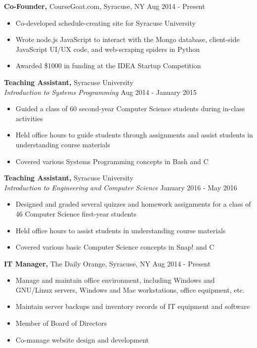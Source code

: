 \documentclass[margin]{res}
\begin{document}
\begin{resume}
 {\bf Co-Founder,} CourseGoat.com, Syracuse, NY \hfill
Aug 2014 - Present
\begin{itemize} \itemsep -2pt
\item  Co-developed schedule-creating site for Syracuse University
\item Wrote node.js JavaScript to interact with the Mongo database, client-side JavaScript UI/UX code, and web-scraping spiders in Python
\item Awarded \$1000 in funding at the IDEA Startup Competition
\end{itemize}

{\bf Teaching Assistant,} Syracuse University \\
{\it Introduction to Systems Programming}
 \hfill  Aug 2014 - January 2015
\begin{itemize} \itemsep -2pt %
\item Guided a class of 60 second-year Computer Science students during in-class activities
\item Held office hours to guide students through assignments and assist students in understanding course materials
\item Covered various Systems Programming concepts in Bash and C
\end{itemize}

{\bf Teaching Assistant,} Syracuse University \\
{\it Introduction to Engineering and Computer Science}
 \hfill  January 2016 - May 2016
\begin{itemize} \itemsep -2pt %
\item Designed and graded several quizzes and homework assignments for a class of 46 Computer Science first-year students
\item Held office hours to assist students in understanding course materials
\item Covered various basic Computer Science concepts in Snap! and C
\end{itemize}

 
{\bf IT Manager,} The Daily Orange, Syracuse, NY \hfill  Aug 2014 - Present
\begin{itemize} \itemsep -2pt %
\item Manage and maintain office environment, including Windows and GNU/Linux servers, Windows and Mac workstations, office equipment, etc.
\item Maintain server backups and inventory records of IT equipment and software
\item Member of Board of Directors
\item Co-manage website design and development
\end{itemize}

\end{resume}
\end{document}
